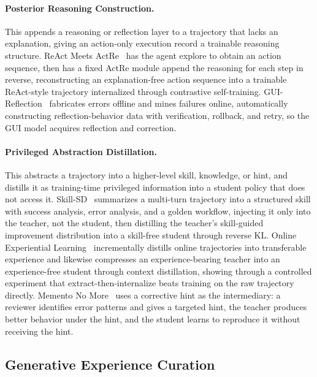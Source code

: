 \paragraph{Posterior Reasoning Construction.} This appends a reasoning or reflection layer to a trajectory that lacks an explanation, giving an action-only execution record a trainable reasoning structure. ReAct Meets ActRe~\cite{Yan24m} has the agent explore to obtain an action sequence, then has a fixed ActRe module append the reasoning for each step in reverse, reconstructing an explanation-free action sequence into a trainable ReAct-style trajectory internalized through contrastive self-training. GUI-Reflection~\cite{Wu25b} fabricates errors offline and mines failures online, automatically constructing reflection-behavior data with verification, rollback, and retry, so the GUI model acquires reflection and correction.

\paragraph{Privileged Abstraction Distillation.} This abstracts a trajectory into a higher-level skill, knowledge, or hint, and distills it as training-time privileged information into a student policy that does not access it. Skill-SD~\cite{Wan26al} summarizes a multi-turn trajectory into a structured skill with success analysis, error analysis, and a golden workflow, injecting it only into the teacher, not the student, then distilling the teacher's skill-guided improvement distribution into a skill-free student through reverse KL. Online Experiential Learning~\cite{Ye26f} incrementally distills online trajectories into transferable experience and likewise compresses an experience-bearing teacher into an experience-free student through context distillation, showing through a controlled experiment that extract-then-internalize beats training on the raw trajectory directly. Memento No More~\cite{Ala25} uses a corrective hint as the intermediary: a reviewer identifies error patterns and gives a targeted hint, the teacher produces better behavior under the hint, and the student learns to reproduce it without receiving the hint.

\subsection{Generative Experience Curation}
\label{sec:experience-curation}

